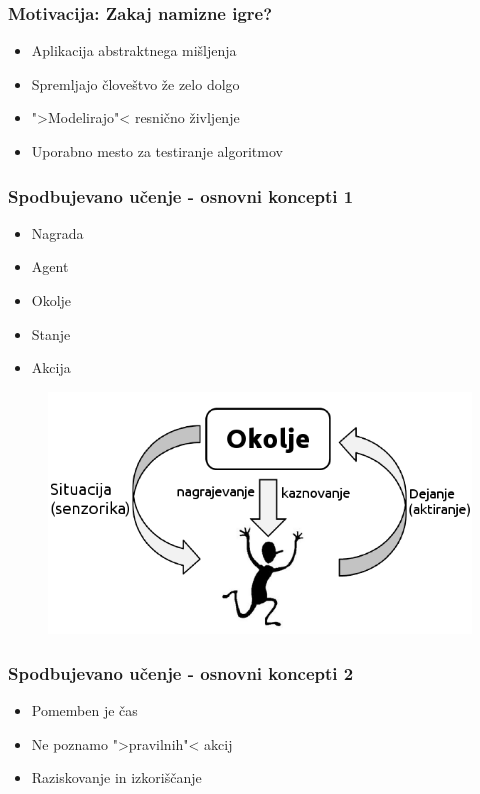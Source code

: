 \documentclass{beamer}    %
\begin{document}
\begin{frame}
    \frametitle{Motivacija: Zakaj namizne igre?}
    \begin{itemize}
        \item Aplikacija abstraktnega mišljenja
        \item Spremljajo človeštvo že zelo dolgo
        \item ">Modelirajo"< resnično življenje 
        \item Uporabno mesto za testiranje algoritmov
    \end{itemize}
\end{frame}


\begin{frame}
    \frametitle{Spodbujevano učenje - osnovni koncepti 1}
    \begin{multicols}{2}
    \begin{itemize}
        \item Nagrada
        \item Agent
        \item Okolje
        \item Stanje
        \item Akcija
    \end{itemize}
    \end{multicols}

    \begin{figure}
        \includegraphics[scale=0.5]{slike/RLloop.png}
    \end{figure}
\end{frame}


\begin{frame}
    \frametitle{Spodbujevano učenje - osnovni koncepti 2}
    \begin{itemize}
        \item Pomemben je čas
        \item Ne poznamo ">pravilnih"< akcij
        \item Raziskovanje in izkoriščanje
    \end{itemize}
\end{frame}
\end{document}
